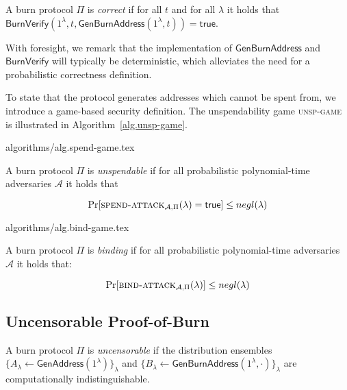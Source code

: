 \begin{definition}[Correctness]
  A burn protocol $\Pi$ is \emph{correct} if for all $t$ and for all $\lambda$ it holds that
  $\mathsf{BurnVerify}(1^\lambda, t, \mathsf{GenBurnAddress}(1^\lambda, t)) = \textsf{true}$.
\end{definition}

With foresight, we remark that the implementation of $\mathsf{GenBurnAddress}$ and $\mathsf{BurnVerify}$ will typically be deterministic, which alleviates the need for a probabilistic correctness definition.

To state that the protocol generates addresses which cannot be spent from, we introduce a game-based security definition. The unspendability game \textsc{unsp-game} is illustrated in Algorithm~\ref{alg.unsp-game}.

{algorithms/alg.spend-game.tex}

\begin{definition}[Unspendability]
  A burn protocol $\Pi$ is \emph{unspendable} if
  for all probabilistic polynomial-time adversaries $\mathcal{A}$
  it holds that

  \[
    \Pr[\textsc{spend-attack}_{\mathcal{A},
    \Pi}(\lambda) = \textsf{true}] \leq negl(\lambda)
  \]
\end{definition}

{algorithms/alg.bind-game.tex}

\begin{definition}[Binding]
  A burn protocol $\Pi$ is \emph{binding} if
  for all probabilistic polynomial-time adversaries $\mathcal{A}$ it holds that:

  \[
    \Pr[\textsc{bind-attack}_{\mathcal{A},\Pi}(\lambda)] \leq negl(\lambda)
  \]
\end{definition}

\subsection{Uncensorable Proof-of-Burn}

\begin{definition}[Uncensorability]
  A burn protocol $\Pi$ is \emph{uncensorable} if
  the distribution ensembles $\{A_\lambda \gets \mathsf{GenAddress}(1^\lambda)\}_\lambda$ and
  $\{B_\lambda \gets \mathsf{GenBurnAddress}(1^\lambda, \cdot)\}_\lambda$ are computationally indistinguishable.
\end{definition}
